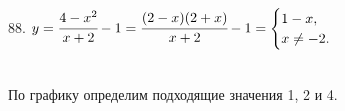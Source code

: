 88. $y=\cfrac{4-x^2}{x+2}-1=\cfrac{(2-x)(2+x)}{x+2}-1=\begin{cases} 1-x,\\ x\neq-2.\end{cases}$\\
\begin{figure}[ht!]
\end{figure}\\
По графику определим подходящие значения 1, 2 и 4.\\

